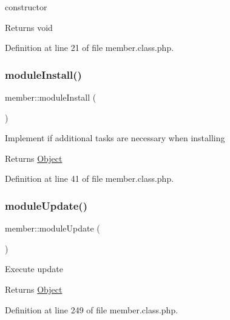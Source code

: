 constructor

\begin{DoxyReturn}{Returns}
void 
\end{DoxyReturn}


Definition at line 21 of file member.\+class.\+php.

\mbox{\label{classmember_a5834fa338d03eedcb5e84bb8ccac305b}} 
\subsubsection{\texorpdfstring{module\+Install()}{moduleInstall()}}
{\footnotesize\ttfamily member\+::module\+Install (\begin{DoxyParamCaption}{ }\end{DoxyParamCaption})}

Implement if additional tasks are necessary when installing

\begin{DoxyReturn}{Returns}
\hyperlink{classObject}{Object} 
\end{DoxyReturn}


Definition at line 41 of file member.\+class.\+php.

\mbox{\label{classmember_a72b7382e568644ccadb69b67e4504086}} 
\subsubsection{\texorpdfstring{module\+Update()}{moduleUpdate()}}
{\footnotesize\ttfamily member\+::module\+Update (\begin{DoxyParamCaption}{ }\end{DoxyParamCaption})}

Execute update

\begin{DoxyReturn}{Returns}
\hyperlink{classObject}{Object} 
\end{DoxyReturn}


Definition at line 249 of file member.\+class.\+php.

\mbox{\label{classmember_ab5bc32f3821f7cba98e34703679c69ee}} 
